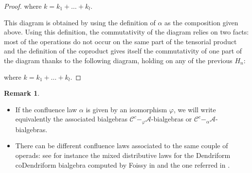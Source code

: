 \documentclass[11pt,leqno]{amsart}
\theoremstyle{definition}
\newtheorem{remark}[definition]{Remark}
\theoremstyle{plain}
\newcommand{\A}{ \mathcal{A} }
\newcommand{\C}{ \mathcal{C} }
\begin{document}
\begin{proof}
\hspace{-1cm}

where $k = k_1 + \ldots + k_l$.


This diagram is obtained by using the definition of $\alpha$ as the composition given above. Using this definition, the commutativity of the diagram relies on two facts: most of the operations do not occur on the same part of the tensorial product and the definition of the coproduct gives itself the commutativity of one part of the diagram thanks to the following diagram, holding on any of the previous $H_n$:


where $k = k_1 + \ldots + k_l$.
\end{proof}


\begin{remark} \begin{itemize}
\item  If the confluence law $\alpha$ is given by an isomorphism $\varphi$, we will write equivalently the associated bialgebras $\C^c-_{\varphi}\A$-bialgebras or $\C^c-_{\alpha}\A$-bialgebras.
\item There can be different confluence laws associated to the same couple of operads: see for instance the mixed distributive laws for the Dendriform coDendriform bialgebra computed by Foissy in \cite{Foissy} and the one referred in \cite{DendTridend}.
\end{itemize}
\end{remark}
\end{document}
